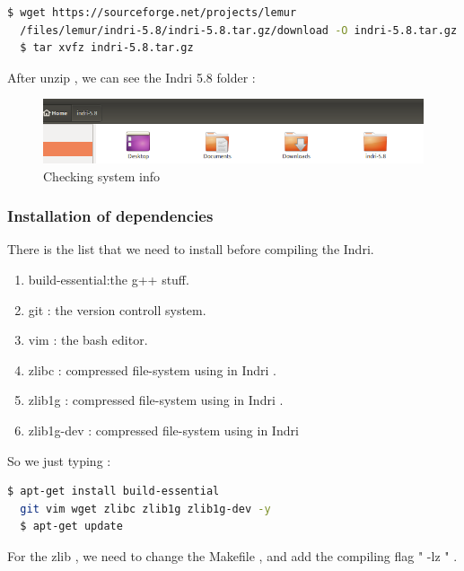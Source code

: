 \documentclass{article}
\def\m_space{\vspace{8pt}}
\begin{document}
\begin{lstlisting}[language=bash,caption={Install Indri in bash}]
  $ wget https://sourceforge.net/projects/lemur
  /files/lemur/indri-5.8/indri-5.8.tar.gz/download -O indri-5.8.tar.gz
  $ tar xvfz indri-5.8.tar.gz
\end{lstlisting}
After unzip , we can see the Indri 5.8 folder :

\begin{figure}[H]
  \begin{center}
  \includegraphics[width=1.0\textwidth]{image/Indri_Folder.png}
  \caption{Checking system info}
  \label{fig:env_04}
  \end{center}
\end{figure}
\m_space
\subsubsection{Installation of dependencies}

There is the list \cite{ref1} that we need to install before compiling the Indri.

\begin{enumerate}
  \item {build-essential:the g++ stuff.}
  \item {git : the version controll system.}
  \item {vim : the bash editor.}
  \item {zlibc :  compressed file-system using in Indri .} 
  \item {zlib1g :  compressed file-system using in Indri .}
  \item {zlib1g-dev :  compressed file-system using in Indri} 
\end{enumerate}
So we just typing : 
\begin{lstlisting}[language=bash,caption={Get dependencies}]
  $ apt-get install build-essential 
  git vim wget zlibc zlib1g zlib1g-dev -y
  $ apt-get update
\end{lstlisting}
For the zlib , we need to change the Makefile \cite{ref2} , and add the compiling flag " -lz " .
\end{document}
